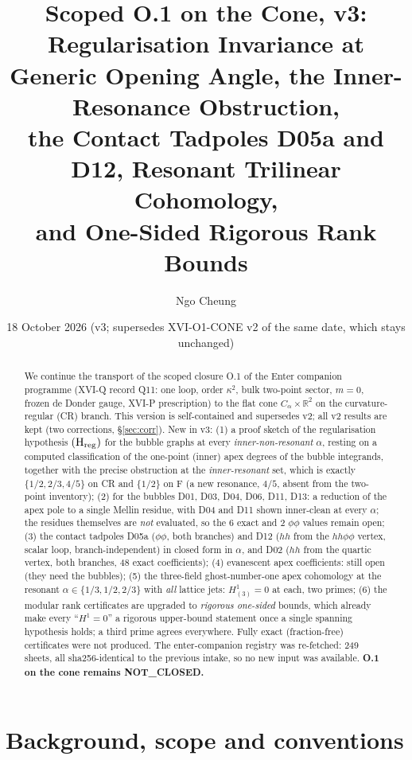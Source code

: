 \documentclass[11pt]{article}
\title{Scoped O.1 on the Cone, v3:\\ Regularisation Invariance at Generic Opening Angle, the Inner-Resonance Obstruction,\\ the Contact Tadpoles D05a and D12, Resonant Trilinear Cohomology,\\ and One-Sided Rigorous Rank Bounds}
\author{Ngo Cheung}
\date{18 October 2026 (v3; supersedes XVI-O1-CONE v2 of the same date, which stays unchanged)}
\theoremstyle{definition}
\newcommand{\ka}{\kappa}
\newcommand{\Hreg}{(\mathrm H_{\rm reg})}
\begin{document}
\sloppy
\maketitle
\begin{abstract}
We continue the transport of the scoped closure O.1 of the Enter companion programme (XVI-Q record Q11: one loop, order $\ka^2$, bulk two-point sector, $m=0$, frozen de Donder gauge, XVI-P prescription) to the flat cone $C_\alpha\times\mathbb R^2$ on the curvature-regular (CR) branch. This version is self-contained and supersedes v2; all v2 results are kept (two corrections, \S\ref{sec:corr}). New in v3:
(1) a proof sketch of the regularisation hypothesis $\Hreg$ for the bubble graphs at every \emph{inner-non-resonant} $\alpha$, resting on a computed classification of the one-point (inner) apex degrees of the bubble integrands, together with the precise obstruction at the \emph{inner-resonant} set, which is exactly $\{1/2,2/3,4/5\}$ on CR and $\{1/2\}$ on F (a new resonance, $4/5$, absent from the two-point inventory);
(2) for the bubbles D01, D03, D04, D06, D11, D13: a reduction of the apex pole to a single Mellin residue, with D04 and D11 shown inner-clean at every $\alpha$; the residues themselves are \emph{not} evaluated, so the 6 exact and 2 $\phi\phi$ values remain open;
(3) the contact tadpoles D05a ($\phi\phi$, both branches) and D12 ($hh$ from the $hh\phi\phi$ vertex, scalar loop, branch-independent) in closed form in $\alpha$, and D02 ($hh$ from the quartic vertex, both branches, 48 exact coefficients);
(4) evanescent apex coefficients: still open (they need the bubbles);
(5) the three-field ghost-number-one apex cohomology at the resonant $\alpha\in\{1/3,1/2,2/3\}$ with \emph{all} lattice jets: $H^1_{(3)}=0$ at each, two primes;
(6) the modular rank certificates are upgraded to \emph{rigorous one-sided} bounds, which already make every ``$H^1=0$'' a rigorous upper-bound statement once a single spanning hypothesis holds; a third prime agrees everywhere. Fully exact (fraction-free) certificates were not produced.
The enter-companion registry was re-fetched: 249 sheets, all sha256-identical to the previous intake, so no new input was available. \textbf{O.1 on the cone remains NOT\_CLOSED.}
\end{abstract}

\section{Background, scope and conventions}
\end{document}
